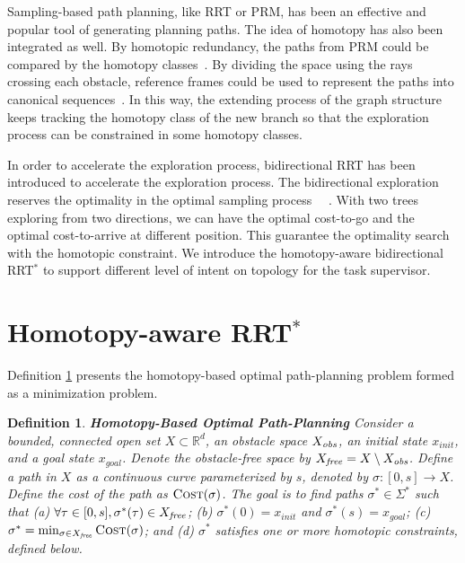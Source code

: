 \documentclass[letterpaper, 10 pt, conference]{ieeeconf}
\newtheorem{defn}{Definition}
\begin{document}
Sampling-based path planning, like RRT or PRM, has been an effective and popular tool of generating planning paths.
The idea of homotopy has also been integrated as well.
By homotopic redundancy, the paths from PRM could be compared by the homotopy classes~\cite{1041613}.
By dividing the space using the rays crossing each obstacle, reference frames could be used to represent the paths into canonical sequences~\cite{Hernandez201544}.
In this way, the extending process of the graph structure keeps tracking the homotopy class of the new branch so that the exploration process can be constrained in some homotopy classes.

In order to accelerate the exploration process, bidirectional RRT has been introduced to accelerate the exploration process.
The bidirectional exploration reserves the optimality in the optimal sampling process
~\cite{Jordan.Perez.ea:CSAIL13}~\cite{starek2014bidirectional}.
With two trees exploring from two directions, we can have the optimal cost-to-go and the optimal cost-to-arrive at different position.
This guarantee the optimality search with the homotopic constraint.
We introduce the homotopy-aware bidirectional RRT$^{*}$ to support different level of intent on topology for the task supervisor.

\section{Homotopy-aware RRT$^{*}$}
\label{sec:algorithm}

Definition \ref{def:homo_path_planning} presents the homotopy-based optimal path-planning problem formed as a minimization problem.
\begin{defn}{ \textbf{Homotopy-Based Optimal Path-Planning} }
\label{def:homo_path_planning}
Consider a bounded, connected open set $ X \subset \mathbb{R}^{d} $, an obstacle space $ X_{\it obs} $, an initial state $ x_{init} $, and a goal state $ x_{goal} $. 
Denote the obstacle-free space by $ X_{\it free} = X \setminus X_{\it obs} $.
Define a {\em path} in $X$ as a continuous curve parameterized by $s$, denoted by $\sigma : [0,s] \rightarrow X$. 
Define the cost of the path as $ \mbox{\sc Cost} (\sigma) $.  
The goal is to find paths $ \sigma^{*} \in \Sigma^{*}$ such that
\textit{ (a) } $ \forall \tau\in[0,s], \sigma^*(\tau) \in X_{\it free}$;
\textit{ (b) } $ \sigma^{*} (0) = x_{init} $ and $ \sigma^{*} (s) = x_{goal}  $;
\textit{ (c) } $ \sigma^{*} = \min_{\sigma \in X_{\it free} } \mbox{\sc Cost}  (\sigma) $; and
\textit{ (d) } $ \sigma^{*}$ satisfies one or more homotopic constraints, defined below.
\end{defn} 
\end{document}
